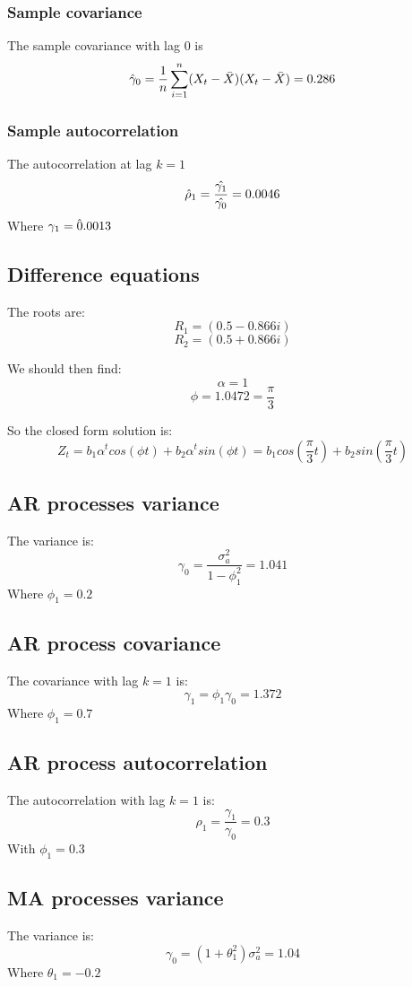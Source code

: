 \documentclass{assignment}
\begin{document}
\subsubsection{Sample covariance}
\noindent The sample covariance with lag $0$ is
$$\Hat{\gamma}_0 = \frac{1}{n}\sum_{i=1}^{n}(X_t-\Bar{X})(X_t-\Bar{X}) = 0.286$$

\subsubsection{Sample autocorrelation}
\noindent The autocorrelation at lag $k=1$
$$\Hat{\rho}_1 = \frac{\Hat{\gamma_1}}{\Hat{\gamma_0}} = 0.0046$$
Where $\Hat{\gamma_1 = 0.0013}$

\subsection{Difference equations}
\noindent The roots are:
$$R_1 = (0.5 - 0.866i)$$
$$R_2 = (0.5 + 0.866i)$$

We should then find:
$$\alpha = 1$$
$$\phi = 1.0472 = \frac{\pi}{3}$$

So the closed form solution is:
$$ Z_t = b_1\alpha^t cos(\phi t) + b_2\alpha^t sin(\phi t) = b_1cos(\frac{\pi}{3}t) + b_2sin(\frac{\pi}{3}t)$$

\subsection{AR processes variance}
\noindent The variance is: 
$$ \gamma_0 = \frac{\sigma_a^2}{1-\phi_1^2} = 1.041 $$
Where $\phi_1 = 0.2$ 

\subsection{AR process covariance}
\noindent The covariance with lag $k=1$ is:
$$\gamma_1 = \phi_1\gamma_0 = 1.372$$
Where $\phi_1 = 0.7$ 

\subsection{AR process autocorrelation}
\noindent The autocorrelation with lag $k=1$ is:
$$\rho_1 = \frac{\gamma_1}{\gamma_0} = 0.3 $$
With $\phi_1 = 0.3$

\subsection{MA processes variance}
\noindent The variance is: 
$$ \gamma_0 = (1+\theta_1^2)\sigma_a^2 = 1.04$$
Where $\theta_1 = -0.2$ 
\end{document}
